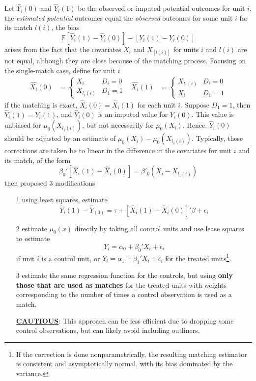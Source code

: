 \documentclass[twoside]{article}
\begin{document}
\begin{itemize}
    Let $\hat{Y}_i(0)$ and $\hat{Y}_i(1)$ be the observed or imputed potential outcomes for unit $i$, the \textit{estimated potential} outcomes equal the \textit{observed} outcomes for some unit $i$ for its match $l(i)$, the bias $$ \mathbb{E}\left[\hat{Y}_i(1) - \hat{Y}_i(0)\right] - \left[Y_i(1)-Y_i(0)\right] $$
    arises from the fact that the covariates $X_i$ and $X_[l(i)]$ for units $i$ and $l(i)$ are not equal, although they are close because of the matching process. Focusing on the single-match case, define for unit $i$ 
    \begin{align*}
        \hat{X_i}(0) &= \begin{cases}
            X_i &D_i=0\\
            X_{l_1(i)}&D_1=1
        \end{cases} &
        \hat{X_i}(1) &= \begin{cases}
            X_{l_1(i)} &D_i=0\\
            X_i &D_1=1
        \end{cases}
    \end{align*}
    if the matching is exact, $\hat{X}_i(0)=\hat{X}_i(1)$ for each unit $i$. Suppose $D_1=1$, then $\hat{Y}_i(1)=Y_i(1)$, and $\hat{Y}_i(0)$ is an imputed value for $Y_i(0)$. This value is unbiased for $\mu_0\left(X_{l_1(i)}\right)$, but not necessarily for $\mu_0\left(X_i\right)$. Hence, $\hat{Y}_i(0)$ should be adjusted by an estimate of $\mu_0\left(X_i\right) - \mu_0\left(X_{l_1(i)}\right)$. Typically, these corrections are taken be to linear in the difference in the covariates for unit $i$ and its match, of the form $$\beta_0'\left[\hat{X}_i(1)-\hat{X}_i(0)\right] = \beta'_0\left(X_i - X_{l_1(i)}\right)$$
    then \citet{rubin1973use} proposed 3 modifications
    \begin{itemize}
        \item[1] using least squares, estimate $$ \hat{Y}_i\left(1\right) -\hat{Y}_(0) = \tau+\left[\hat{X}_i(1)-\hat{X}_i(0)\right]'\beta + \epsilon_i $$
        \item[2] estimate $\mu_0(x)$ directly by taking all control units and use lease squares to estimate $$ Y_i = \alpha_0 + \beta_0'X_i + \epsilon_i $$
        if unit $i$ is a control unit, or $Y_i=\alpha_1+\beta_1'X_i+\epsilon_i$ for the treated units\footnote{If the correction is done nonparametrically, the resulting matching estimator is consistent and asymptotically normal, with its bias dominated by the variance.}.
        \item[3] estimate the same regression function for the controls, but using \textbf{only those that are used as matches} for the treated units with weights corresponding to the number of times a control observation is used as a match.
        
        \textbf{\underline{CAUTIOUS}}: This approach can be less efficient due to dropping some control observations, but can likely avoid including outliners. 
    \end{itemize}
\end{itemize}
\end{document}
